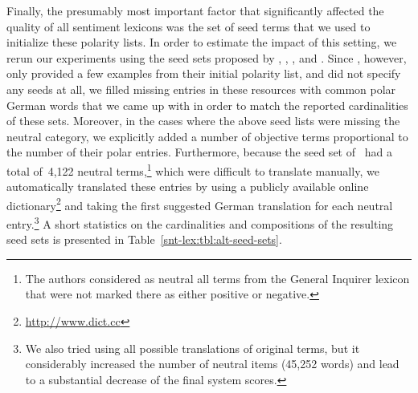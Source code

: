 Finally, the presumably most important factor that significantly
affected the quality of all sentiment lexicons was the set of seed
terms that we used to initialize these polarity lists.  In order to
estimate the impact of this setting, we rerun our experiments using
the seed sets proposed by \citet{Hu:04}, \citet{Kim:04},
\citet{Esuli:06c}, and \citet{Remus:10}.  Since \citet{Hu:04},
however, only provided a few examples from their initial polarity
list, and \citet{Kim:04} did not specify any seeds at all, we filled
missing entries in these resources with common polar German words that
we came up with in order to match the reported cardinalities of these
sets.  Moreover, in the cases where the above seed lists were missing
the neutral category, we explicitly added a number of objective terms
proportional to the number of their polar entries.  Furthermore,
because the seed set of~\citet{Esuli:06c} had a total of~4,122 neutral
terms,\footnote{The authors considered as neutral all terms from the
  General Inquirer lexicon \cite{Stone:66} that were not marked there
  as either positive or negative.} which were difficult to translate
manually, we automatically translated these entries by using a
publicly available online
dictionary\footnote{\url{http://www.dict.cc}} and taking the first
suggested German translation for each neutral entry.\footnote{We also
  tried using all possible translations of original terms, but it
  considerably increased the number of neutral items (45,252 words)
  and lead to a substantial decrease of the final system scores.} A
short statistics on the cardinalities and compositions of the
resulting seed sets is presented in
Table~\ref{snt-lex:tbl:alt-seed-sets}.

